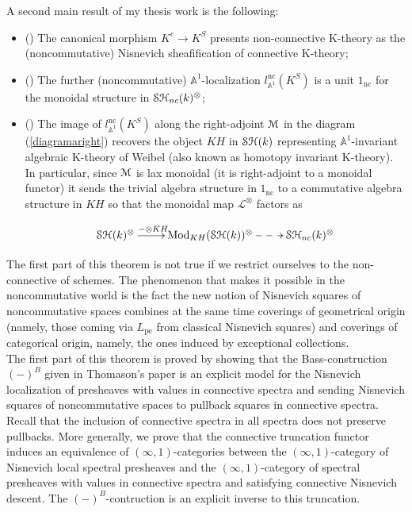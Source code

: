 \begin{refsection}
A second main result of my thesis work is the following:


\begin{thm}
\hfill 
\begin{itemize}

\item (\cite[1.9]{nc2}) The canonical morphism $K^c\to K^S$ presents non-connective K-theory as the (noncommutative) Nisnevich sheafification of connective K-theory;
\item (\cite[1.12]{nc2}) The further (noncommutative) $\mathbb{A}^1$-localization $l_{\mathbb{A}^1}^\mathrm{nc}(K^S)$ is a unit $1_\mathrm{nc}$ for the monoidal structure in $\mathcal{S}\mathcal{H}_{nc}(k)^{\otimes}$;
\item (\cite[1.11]{nc2}) The image of  $l_{\mathbb{A}^1}^\mathrm{nc}(K^S)$ along the right-adjoint $\mathcal{M}$ in the diagram (\ref{diagramaright}) recovers the object $KH$ in $\mathcal{S}\mathcal{H}(k)$ representing $\mathbb{A}^1$-invariant algebraic K-theory of Weibel (also known as homotopy invariant K-theory). In particular, since $\mathcal{M}$ is lax monoidal (it is right-adjoint to a monoidal functor) it sends the trivial algebra structure in $1_\mathrm{nc}$ to a commutative algebra structure in $KH$ so that the monoidal map $\mathcal{L}^{\otimes}$ factors as

$$
\xymatrix{\stmonoidalk\ar[r]^(0.4){-\otimes KH} & \mathrm{Mod}_{KH}(\stk)^{\otimes}\ar@{-->}[r]& \stncmonoidalk}
$$

\end{itemize}
\end{thm}

The first part of this theorem is not true if we restrict ourselves to the non-connective of schemes. The phenomenon that makes it possible in the noncommutative world is the fact the new notion of Nisnevich squares of noncommutative spaces combines at the same time coverings of geometrical origin (namely, those coming via $L_\mathrm{pe}$ from classical Nisnevich squares) and coverings of categorical origin, namely, the ones induced by exceptional collections. \\

The first part of this theorem is proved by showing that the Bass-construction $(-)^B$ given in Thomason's paper \cite{thomasonalgebraic} is an explicit model for the Nisnevich localization of presheaves with values in connective spectra and sending Nisnevich squares of noncommutative spaces to pullback squares in connective spectra. Recall that the inclusion of connective spectra in all spectra does not preserve pullbacks. More generally, we prove that the connective truncation functor induces an equivalence of $(\infty,1)$-categories between the $(\infty,1)$-category of Nisnevich local spectral presheaves and the $(\infty,1)$-category of spectral presheaves with values in connective spectra and satisfying connective Nisnevich descent. The $(-)^B$-contruction is an explicit inverse to this truncation.\\



\end{refsection}

